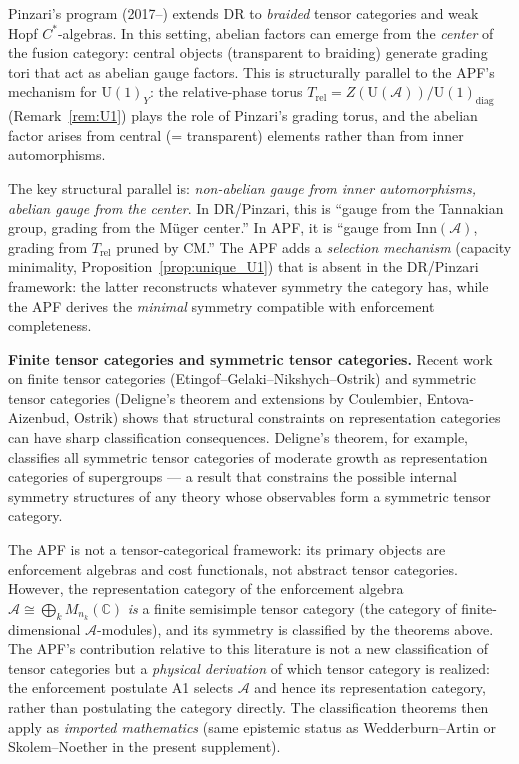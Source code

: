 \documentclass[11pt,a4paper]{article}
\theoremstyle{definition}
\newcommand{\U}{\mathrm{U}}
\begin{document}
Pinzari's program (2017--) extends DR to \emph{braided} tensor
categories and weak Hopf $C^*$-algebras.  In this setting, abelian
factors can emerge from the \emph{center} of the fusion category:
central objects (transparent to braiding) generate grading tori that
act as abelian gauge factors.  This is structurally parallel to the
APF's mechanism for $\U(1)_Y$: the relative-phase torus
$T_{\mathrm{rel}} = Z(\mathrm{U}(\mathcal{A})) /
\mathrm{U}(1)_{\mathrm{diag}}$ (Remark~\ref{rem:U1}) plays the role
of Pinzari's grading torus, and the abelian factor arises from
central (= transparent) elements rather than from inner automorphisms.

The key structural parallel is: \emph{non-abelian gauge from inner
automorphisms, abelian gauge from the center}.  In DR/Pinzari, this
is ``gauge from the Tannakian group, grading from the M\"uger center.''
In APF, it is ``gauge from $\mathrm{Inn}(\mathcal{A})$, grading from
$T_{\mathrm{rel}}$ pruned by CM.''  The APF adds a \emph{selection
mechanism} (capacity minimality, Proposition~\ref{prop:unique_U1})
that is absent in the DR/Pinzari framework: the latter reconstructs
whatever symmetry the category has, while the APF derives the
\emph{minimal} symmetry compatible with enforcement completeness.

\smallskip\noindent\textbf{Finite tensor categories and symmetric
tensor categories.}\quad
Recent work on finite tensor categories (Etingof--Gelaki--Nikshych--Ostrik)
and symmetric tensor categories (Deligne's theorem and extensions by
Coulembier, Entova-Aizenbud, Ostrik) shows that structural constraints
on representation categories can have sharp classification
consequences.  Deligne's theorem, for example, classifies all
symmetric tensor categories of moderate growth as representation
categories of supergroups --- a result that constrains the possible
internal symmetry structures of any theory whose observables form a
symmetric tensor category.

The APF is not a tensor-categorical framework: its primary objects are
enforcement algebras and cost functionals, not abstract tensor
categories.  However, the representation category of the enforcement
algebra $\mathcal{A} \cong \bigoplus_k M_{n_k}(\mathbb{C})$
\emph{is} a finite semisimple tensor category (the category of
finite-dimensional $\mathcal{A}$-modules), and its symmetry is
classified by the theorems above.  The APF's contribution relative to
this literature is not a new classification of tensor categories but a
\emph{physical derivation} of which tensor category is realized: the
enforcement postulate A1 selects $\mathcal{A}$ and hence its
representation category, rather than postulating the category
directly.  The classification theorems then apply as \emph{imported
mathematics} (same epistemic status as Wedderburn--Artin or
Skolem--Noether in the present supplement).
\end{document}

